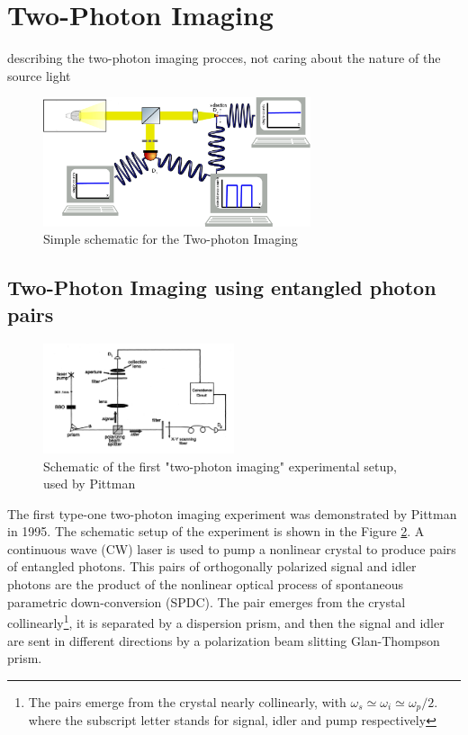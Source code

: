 \section{Two-Photon Imaging}

describing the two-photon imaging procces, not caring about the nature of the source light
\begin{figure}[h]
\centering
\includegraphics[width=0.7\textwidth]{Figures/twoPhotonSetup.png}
\caption{Simple schematic for the Two-photon Imaging} 
\label{fig:twoPhotonSetup}
\end{figure}


\subsection{Two-Photon Imaging using entangled photon pairs}



\begin{figure}[h]
\centering
\includegraphics[width=0.5\textwidth]{Figures/pittman.png}
\caption{Schematic of the first "two-photon imaging" experimental setup, used by Pittman\cite{pittman}} 
\label{fig:pittman}
\end{figure}
The first type-one two-photon imaging experiment was demonstrated by Pittman
in 1995\cite{pittman}. The schematic setup of the experiment is shown in the 
Figure \ref{fig:pittman}. A continuous wave (CW) laser is used to pump a nonlinear 
crystal to produce pairs of entangled photons. 
This pairs of orthogonally polarized signal and idler photons are the product
of the nonlinear optical process of spontaneous parametric down-conversion (SPDC).
The pair emerges from the crystal collinearly\footnote{The pairs emerge from the crystal nearly 
collinearly, with $\omega_s \simeq \omega_i \simeq \omega_p / 2$. where the subscript
letter stands for signal, idler and pump respectively}, it is separated by a dispersion prism, 
and then the signal and idler are sent in different directions by a polarization
beam slitting Glan-Thompson prism. 

